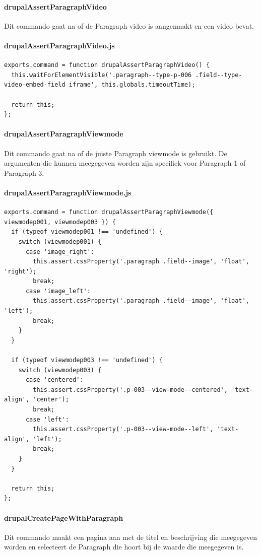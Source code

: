 \clearpage
\paragraph{drupalAssertParagraphVideo}
\label{commando11}
Dit commando gaat na of de Paragraph video is aangemaakt en een video bevat.
\paragraph{drupalAssertParagraphVideo.js}
\begin{lstlisting}[breaklines=true]
exports.command = function drupalAssertParagraphVideo() {
  this.waitForElementVisible('.paragraph--type-p-006 .field--type-video-embed-field iframe', this.globals.timeoutTime);

  return this;
};
\end{lstlisting}


\clearpage
\paragraph{drupalAssertParagraphViewmode}
\label{commando12}
Dit commando gaat na of de juiste Paragraph viewmode is gebruikt. De argumenten die kunnen meegegeven worden zijn specifiek voor Paragraph 1 of Paragraph 3.
\paragraph{drupalAssertParagraphViewmode.js}
\begin{lstlisting}[breaklines=true]
exports.command = function drupalAssertParagraphViewmode({ viewmodep001, viewmodep003 }) {
  if (typeof viewmodep001 !== 'undefined') {
    switch (viewmodep001) {
      case 'image_right':
        this.assert.cssProperty('.paragraph .field--image', 'float', 'right');
        break;
      case 'image_left':
        this.assert.cssProperty('.paragraph .field--image', 'float', 'left');
        break;
    }
  }

  if (typeof viewmodep003 !== 'undefined') {
    switch (viewmodep003) {
      case 'centered':
        this.assert.cssProperty('.p-003--view-mode--centered', 'text-align', 'center');
        break;
      case 'left':
        this.assert.cssProperty('.p-003--view-mode--left', 'text-align', 'left');
        break;
    }
  }

  return this;
};
\end{lstlisting}


\clearpage
\paragraph{drupalCreatePageWithParagraph}
\label{commando13}
Dit commando maakt een pagina aan met de titel en beschrijving die meegegeven worden en selecteert de Paragraph die hoort bij de waarde die meegegeven is.
